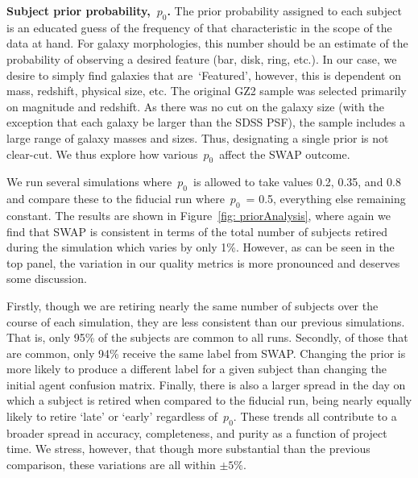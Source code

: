 \documentclass[twocolumn]{aastex6}
\newcommand{\p}{$p_0$}
\newcommand{\feat}{`Featured'}
\begin{document}
\begin{figure}[t!]

\end{figure}


\textbf{Subject prior probability,~\p.}
The prior probability assigned to each subject is an educated guess of 
the frequency of that characteristic in the scope of the data at hand. 
For galaxy morphologies, this number should be an estimate of the probability
of observing a desired feature (bar, disk, ring, etc.). In our case, 
we desire to simply find galaxies that are~\feat, however, this is dependent 
on mass, redshift, physical size, etc. The original GZ2 sample was selected
primarily on magnitude and redshift.  As there was no cut on the galaxy size
(with the exception that each galaxy be larger than the SDSS PSF), the sample
includes a large range of galaxy masses and sizes. Thus, designating a single 
prior is not clear-cut. We thus explore how various~\p~affect the SWAP outcome.

We run several simulations where~\p~is allowed to take values 0.2, 0.35, and 0.8 
and compare these to the fiducial run where~\p~= 0.5, everything else remaining constant.
The results are shown in Figure~\ref{fig: priorAnalysis}, where again we find that 
SWAP is consistent in terms of the total number of subjects retired 
during the simulation which varies by only 1\%. 
However, as can be seen in the top panel, the variation in our quality metrics is 
more pronounced and deserves some discussion. 

Firstly, though we are retiring nearly the same number of subjects over the course
of each simulation, they are less consistent than our previous simulations. That is, 
only 95\% of the subjects are common to all runs. Secondly, of those that are 
common, only 94\% receive the same label from SWAP. Changing the prior is more
likely to produce a different label for a given subject than changing the initial 
agent confusion matrix. Finally, there is also a larger spread in the day on which 
a subject is retired when compared to the fiducial run, being nearly equally likely to 
retire `late' or `early' regardless of~\p. These trends all contribute to a broader 
spread in accuracy, completeness, and purity as a function of project time.
We stress, however, that though more substantial than the previous comparison, 
these variations are all within $\pm5\%$. 
\end{document}
